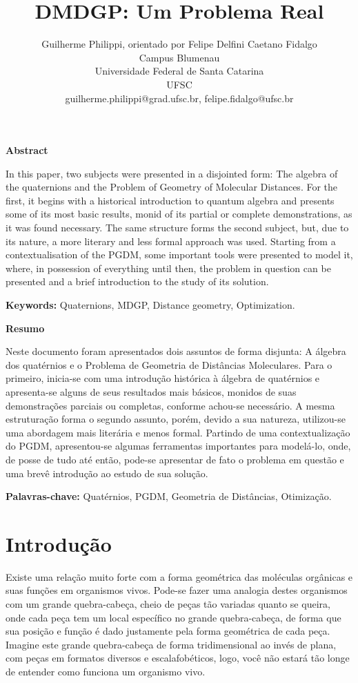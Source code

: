 \documentclass[a4paper,12pt]{article}
\title{DMDGP: Um Problema Real}
\author{Guilherme Philippi\Mark{*}, orientado por Felipe Delfini Caetano Fidalgo\Mark{\dagger}\\Campus Blumenau\\Universidade Federal de Santa Catarina\\UFSC
\\guilherme.philippi@grad.ufsc.br\Mark{*}, felipe.fidalgo@ufsc.br\Mark{\dagger}}
\begin{document}
	\maketitle
	\tableofcontents
	\newpage
	
	\begin{center}
		\large
		\textbf{Abstract}
	\end{center}
	
	In this paper, two subjects were presented in a disjointed form: The algebra of
	the quaternions and the Problem of Geometry of Molecular Distances. For the first,
	it begins with a historical introduction to quantum algebra and presents some of its	most basic results, monid of its partial or complete demonstrations, as it was found necessary. The same structure forms the second subject, but, due to its nature, a more literary and less formal approach was used. Starting from a contextualisation of the PGDM, some important tools were presented to model it, where, in possession of everything until then, the problem in question can be presented and a brief introduction to the study of its solution.
 
	
	\textbf{Keywords:} Quaternions, MDGP, Distance geometry, Optimization.
	 
	
	\vspace{2cm}	
	\begin{center}
		\large
		\textbf{Resumo}
	\end{center}

	Neste documento foram apresentados dois assuntos de forma disjunta: A álgebra dos quatérnios e o Problema de Geometria de Distâncias Moleculares. Para o primeiro, inicia-se com uma introdução histórica à álgebra de quatérnios e apresenta-se alguns de seus resultados mais básicos, monidos de suas demonstrações parciais ou completas, conforme achou-se necessário. A mesma estruturação forma o segundo assunto, porém, devido a sua natureza, utilizou-se uma abordagem mais literária e menos formal. Partindo de uma contextualização do PGDM, apresentou-se algumas ferramentas importantes para modelá-lo, onde, de posse de tudo até então, pode-se apresentar de fato o problema em questão e uma brevê introdução ao estudo de sua solução. 
	
	\textbf{Palavras-chave:} Quatérnios, PGDM, Geometria de Distâncias, Otimização.
	
	
	\newpage
	\section{Introdução}
	Existe uma relação muito forte com a forma geométrica das moléculas orgânicas e suas funções em organismos vivos. Pode-se fazer uma analogia destes organismos com um grande quebra-cabeça, cheio de peças tão variadas quanto se queira, onde cada peça tem um local específico no grande quebra-cabeça, de forma que sua posição e função é dado justamente pela forma geométrica de cada peça. Imagine este grande quebra-cabeça de forma tridimensional ao invés de plana, com peças em formatos diversos e escalafobéticos, logo, você não estará tão longe de entender como funciona um organismo vivo.
	
\end{document}
